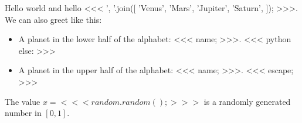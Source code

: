 \documentclass[a4paper]{report}
\begin{document}
    Hello world and hello <<<
        ', '.join([
            'Venus',
            'Mars',
            'Jupiter',
            'Saturn',
        ]);
    >>>. We can also greet like this:

    \begin{itemize}
        <<< python
        for name in [
            # 'Sun',
            'Mercury',
            'Venus',
            'Earth',
            'Mars',
            'Jupiter',
            'Saturn',
            'Uranus',
            'Neptune',
        ]:
            if re.match(r'^[a-m]', name, re.IGNORECASE):
        >>>
        \item A planet in the lower half of the alphabet: <<< name; >>>.
        <<< python
            else:
        >>>
        \item A planet in the upper half of the alphabet: <<< name; >>>.
        <<< escape; >>>
    \end{itemize}

    The value $x=<<< random.random(); >>>$ is a randomly generated number in $[0,1]$.
\end{document}

